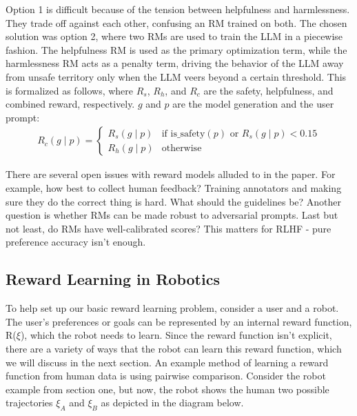 \documentclass[
  letterpaper,
  numbers=noenddot,
  DIV=11,
  oneside]{scrreprt}
\theoremstyle{remark}
\begin{document}
Option 1 is difficult because of the tension between helpfulness and
harmlessness. They trade off against each other, confusing an RM trained
on both. The chosen solution was option 2, where two RMs are used to
train the LLM in a piecewise fashion. The helpfulness RM is used as the
primary optimization term, while the harmlessness RM acts as a penalty
term, driving the behavior of the LLM away from unsafe territory only
when the LLM veers beyond a certain threshold. This is formalized as
follows, where \(R_s\), \(R_h\), and \(R_c\) are the safety,
helpfulness, and combined reward, respectively. \(g\) and \(p\) are the
model generation and the user prompt: \[\begin{aligned}
    R_c(g \mid p) =
    \begin{cases}
        R_s(g \mid p) & \text{if } \text{is\_safety}(p) \text{ or } R_s(g \mid p) < 0.15 \\
        R_h(g \mid p) & \text{otherwise}
    \end{cases}
\end{aligned}\]

There are several open issues with reward models alluded to in the
paper. For example, how best to collect human feedback? Training
annotators and making sure they do the correct thing is hard. What
should the guidelines be? Another question is whether RMs can be made
robust to adversarial prompts. Last but not least, do RMs have
well-calibrated scores? This matters for RLHF - pure preference accuracy
isn't enough.

\subsection{Reward Learning in
Robotics}\label{reward-learning-in-robotics}

To help set up our basic reward learning problem, consider a user and a
robot. The user's preferences or goals can be represented by an internal
reward function, R(\(\xi\)), which the robot needs to learn. Since the
reward function isn't explicit, there are a variety of ways that the
robot can learn this reward function, which we will discuss in the next
section. An example method of learning a reward function from human data
is using pairwise comparison. Consider the robot example from section
one, but now, the robot shows the human two possible trajectories
\(\xi_A\) and \(\xi_B\) as depicted in the diagram below.
\end{document}
